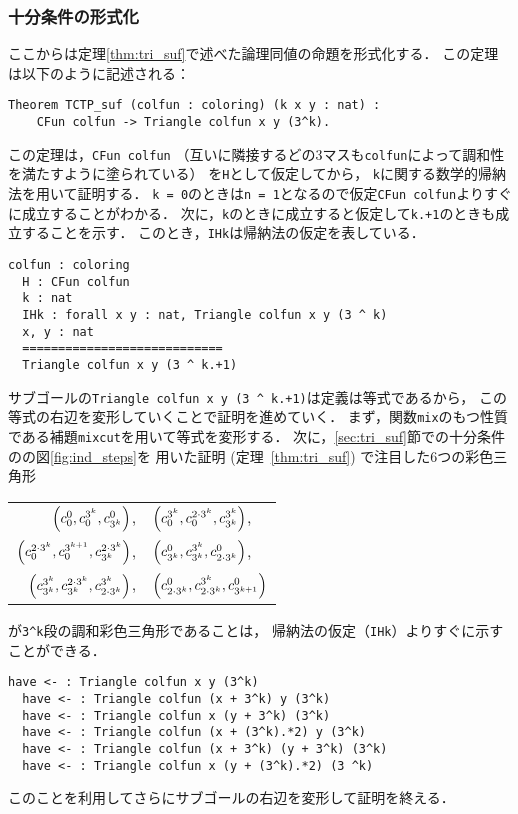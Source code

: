 \subsubsection{十分条件の形式化}
ここからは定理\ref{thm:tri_suf}で述べた論理同値の命題を形式化する．
この定理は以下のように記述される：
\begin{lstlisting}[language=Coq]
  Theorem TCTP_suf (colfun : coloring) (k x y : nat) :
    CFun colfun -> Triangle colfun x y (3^k).
\end{lstlisting}
この定理は，{\tt{CFun colfun}}
（互いに隣接するどの3マスも{\tt{colfun}}によって調和性を満たすように塗られている）
を{\tt{H}}として仮定してから，
{\tt{k}}に関する数学的帰納法を用いて証明する．
{\tt{k = 0}}のときは{\tt{n = 1}}となるので仮定{\tt{CFun colfun}}よりすぐに成立することがわかる．
次に，{\tt{k}}のときに成立すると仮定して{\tt{k.+1}}のときも成立することを示す．
このとき，{\tt{IHk}}は帰納法の仮定を表している．
\begin{lstlisting}[language=Coq]
  colfun : coloring
  H : CFun colfun
  k : nat
  IHk : forall x y : nat, Triangle colfun x y (3 ^ k)
  x, y : nat
  ============================
  Triangle colfun x y (3 ^ k.+1)
\end{lstlisting}
サブゴールの{\tt{Triangle colfun x y (3 \verb|^| k.+1)}}は定義は等式であるから，
この等式の右辺を変形していくことで証明を進めていく．
まず，関数{\tt{mix}}のもつ性質である補題{\tt{mixcut}}を用いて等式を変形する．
次に，\ref{sec:tri_suf}節での十分条件のの図\ref{fig:ind_steps}を
用いた証明 (定理~\ref{thm:tri_suf}) で注目した6つの彩色三角形
\begin{center}
  \begin{tabular}{rl}
    $\left(c^{0}_{0},c^{3^{k}}_{0},c^{0}_{3^{k}}\right)$,
    &
    $\left(c^{3^{k}}_{0},c^{2\cdot3^{k}}_{0},c^{3^{k}}_{3^{k}}\right)$,
    \\
    $\left(c^{2\cdot3^{k}}_{0},c^{3^{k+1}}_{0},c^{2\cdot3^{k}}_{3^{k}}\right)$,
    &
    $\left(c^{0}_{3^{k}},c^{3^{k}}_{3^{k}},c^{0}_{2\cdot3^{k}}\right)$,
    \\
    $\left(c^{3^{k}}_{3^{k}},c^{2\cdot3^{k}}_{3^{k}},c^{3^{k}}_{2\cdot3^{k}}\right)$,
    &
    $\left(c^{0}_{2\cdot3^{k}},c^{3^{k}}_{2\cdot3^{k}},c^{0}_{3^{k+1}}\right)$
  \end{tabular}
\end{center}
が{\tt{3\verb|^|k}}段の調和彩色三角形であることは，
帰納法の仮定（{\tt{IHk}}）よりすぐに示すことができる．
\begin{lstlisting}[language=Coq]
  have <- : Triangle colfun x y (3^k)
  have <- : Triangle colfun (x + 3^k) y (3^k)
  have <- : Triangle colfun x (y + 3^k) (3^k)
  have <- : Triangle colfun (x + (3^k).*2) y (3^k)
  have <- : Triangle colfun (x + 3^k) (y + 3^k) (3^k)
  have <- : Triangle colfun x (y + (3^k).*2) (3 ^k)
\end{lstlisting}
このことを利用してさらにサブゴールの右辺を変形して証明を終える．

